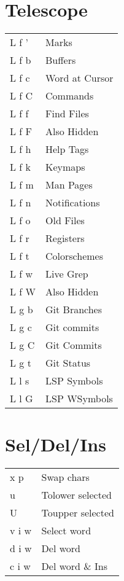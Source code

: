 \documentclass[
  ,landscape
  ,columns=4
]{cheatsheet}
\begin{document}
\section{Telescope}

\begin{tabular}{ll}
	L f ' & Marks          \\
	L f b & Buffers        \\
	L f c & Word at Cursor \\
	L f C & Commands       \\
	L f f & Find Files     \\
	L f F & Also Hidden    \\
	L f h & Help Tags      \\
	L f k & Keymaps        \\
	L f m & Man Pages      \\
	L f n & Notifications  \\
	L f o & Old Files      \\
	L f r & Registers      \\
	L f t & Colorschemes   \\
	L f w & Live Grep      \\
	L f W & Also Hidden    \\
	L g b & Git Branches   \\
	L g c & Git commits    \\
	L g C & Git Commits    \\
	L g t & Git Status     \\
	L l s & LSP Symbols    \\
	L l G & LSP WSymbols   \\
\end{tabular}

\section{Sel/Del/Ins}

\begin{tabular}{ll}
	x p   & Swap chars       \\
	u     & Tolower selected \\
	U     & Toupper selected \\
	v i w & Select word      \\
	d i w & Del word         \\
	c i w & Del word \& Ins  \\
\end{tabular}
\end{document}
